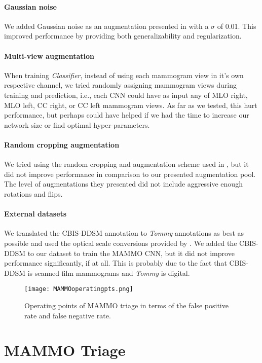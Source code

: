 \documentclass[journal]{IEEEtran}
\begin{document}
\paragraph{Gaussian noise} We added Gaussian noise as an augmentation presented in \cite{gaussian-2015} with a $\sigma$ of 0.01.  This improved performance by providing both generalizability and regularization.

\paragraph{Multi-view augmentation} When training \textit{Classifier}, instead of using each mammogram view in it's own respective channel, we tried randomly assigning mammogram views during training and prediction, i.e., each CNN could have as input any of MLO right, MLO left, CC right, or CC left mammogram views.  As far as we tested, this hurt performance, but perhaps could have helped if we had the time to increase our network size or find optimal hyper-parameters.  
\paragraph{Random cropping augmentation} We tried using the random cropping and augmentation scheme used in \cite{krysztof-etal-2017}, but it did not improve performance in comparison to our presented augmentation pool. The level of augmentations they presented did not include aggressive enough rotations and flips.  
\paragraph{External datasets} We translated the CBIS-DDSM annotation to \textit{Tommy} annotations as best as possible and used the optical scale conversions provided by \cite{ddsm-database1, ddsm-database2}.  We added the CBIS-DDSM to our dataset to train the MAMMO CNN, but it did not improve performance significantly, if at all. This is probably due to the fact that CBIS-DDSM is scanned film mammograms and \textit{Tommy} is digital.

\begin{figure}[t]
\centering
  \texttt{[image: MAMMOoperatingpts.png]}
  \caption{Operating points of MAMMO triage in terms of the false positive rate and false negative rate. }
  \label{fig:MAMMOoperating}
\end{figure}

\section{\label{Appendix:triage} MAMMO Triage}
\end{document}
